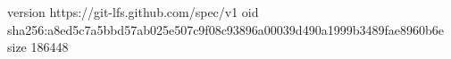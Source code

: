 version https://git-lfs.github.com/spec/v1
oid sha256:a8ed5c7a5bbd57ab025e507c9f08c93896a00039d490a1999b3489fae8960b6e
size 186448
